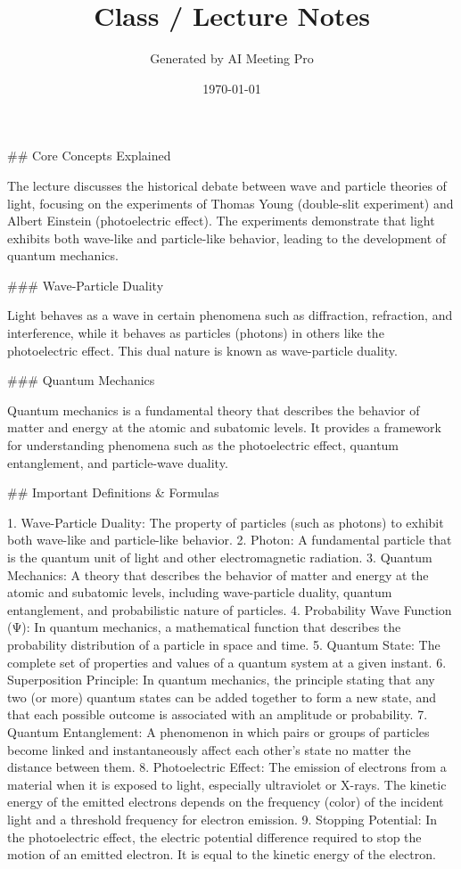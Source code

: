 \documentclass{article}
\title{Class / Lecture Notes}
\author{Generated by AI Meeting Pro}
\date{\today}
\begin{document}
\maketitle
## Core Concepts Explained

The lecture discusses the historical debate between wave and particle theories of light, focusing on the experiments of Thomas Young (double-slit experiment) and Albert Einstein (photoelectric effect). The experiments demonstrate that light exhibits both wave-like and particle-like behavior, leading to the development of quantum mechanics.

### Wave-Particle Duality

Light behaves as a wave in certain phenomena such as diffraction, refraction, and interference, while it behaves as particles (photons) in others like the photoelectric effect. This dual nature is known as wave-particle duality.

### Quantum Mechanics

Quantum mechanics is a fundamental theory that describes the behavior of matter and energy at the atomic and subatomic levels. It provides a framework for understanding phenomena such as the photoelectric effect, quantum entanglement, and particle-wave duality.

## Important Definitions & Formulas

1. Wave-Particle Duality: The property of particles (such as photons) to exhibit both wave-like and particle-like behavior.
2. Photon: A fundamental particle that is the quantum unit of light and other electromagnetic radiation.
3. Quantum Mechanics: A theory that describes the behavior of matter and energy at the atomic and subatomic levels, including wave-particle duality, quantum entanglement, and probabilistic nature of particles.
4. Probability Wave Function (Ψ): In quantum mechanics, a mathematical function that describes the probability distribution of a particle in space and time.
5. Quantum State: The complete set of properties and values of a quantum system at a given instant.
6. Superposition Principle: In quantum mechanics, the principle stating that any two (or more) quantum states can be added together to form a new state, and that each possible outcome is associated with an amplitude or probability.
7. Quantum Entanglement: A phenomenon in which pairs or groups of particles become linked and instantaneously affect each other's state no matter the distance between them.
8. Photoelectric Effect: The emission of electrons from a material when it is exposed to light, especially ultraviolet or X-rays. The kinetic energy of the emitted electrons depends on the frequency (color) of the incident light and a threshold frequency for electron emission.
9. Stopping Potential: In the photoelectric effect, the electric potential difference required to stop the motion of an emitted electron. It is equal to the kinetic energy of the electron.
\end{document}
